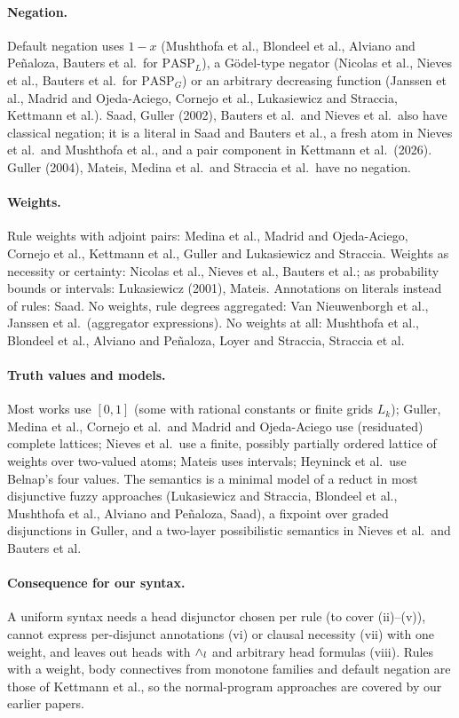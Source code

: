 \paragraph{Negation.}
Default negation uses $1-x$ (Mushthofa et al., Blondeel et al., Alviano and Pe\~naloza, Bauters et al.\ for $\mathrm{PASP}_L$), a Gödel-type negator (Nicolas et al., Nieves et al., Bauters et al.\ for $\mathrm{PASP}_G$) or an arbitrary decreasing function (Janssen et al., Madrid and Ojeda-Aciego, Cornejo et al., Lukasiewicz and Straccia, Kettmann et al.).
Saad, Guller (2002), Bauters et al.\ and Nieves et al.\ also have classical negation; it is a literal in Saad and Bauters et al., a fresh atom in Nieves et al.\ and Mushthofa et al., and a pair component in Kettmann et al.\ (2026).
Guller (2004), Mateis, Medina et al.\ and Straccia et al.\ have no negation.

\paragraph{Weights.}
Rule weights with adjoint pairs: Medina et al., Madrid and Ojeda-Aciego, Cornejo et al., Kettmann et al., Guller and Lukasiewicz and Straccia.
Weights as necessity or certainty: Nicolas et al., Nieves et al., Bauters et al.; as probability bounds or intervals: Lukasiewicz (2001), Mateis.
Annotations on literals instead of rules: Saad.
No weights, rule degrees aggregated: Van Nieuwenborgh et al., Janssen et al.\ (aggregator expressions).
No weights at all: Mushthofa et al., Blondeel et al., Alviano and Pe\~naloza, Loyer and Straccia, Straccia et al.

\paragraph{Truth values and models.}
Most works use $[0,1]$ (some with rational constants or finite grids $L_k$); Guller, Medina et al., Cornejo et al.\ and Madrid and Ojeda-Aciego use (residuated) complete lattices; Nieves et al.\ use a finite, possibly partially ordered lattice of weights over two-valued atoms; Mateis uses intervals; Heyninck et al.\ use Belnap's four values.
The semantics is a minimal model of a reduct in most disjunctive fuzzy approaches (Lukasiewicz and Straccia, Blondeel et al., Mushthofa et al., Alviano and Pe\~naloza, Saad), a fixpoint over graded disjunctions in Guller, and a two-layer possibilistic semantics in Nieves et al.\ and Bauters et al.

\paragraph{Consequence for our syntax.}
A uniform syntax needs a head disjunctor chosen per rule (to cover (ii)--(v)), cannot express per-disjunct annotations (vi) or clausal necessity (vii) with one weight, and leaves out heads with $\land_l$ and arbitrary head formulas (viii).
Rules with a weight, body connectives from monotone families and default negation are those of Kettmann et al., so the normal-program approaches are covered by our earlier papers.


